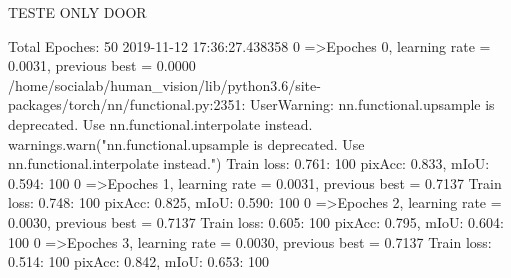 \bigskip

TESTE ONLY DOOR


Total Epoches: 50
2019-11-12 17:36:27.438358
  0%
=>Epoches 0, learning rate = 0.0031,                 previous best = 0.0000
/home/socialab/human_vision/lib/python3.6/site-packages/torch/nn/functional.py:2351: UserWarning: nn.functional.upsample is deprecated. Use nn.functional.interpolate instead.
  warnings.warn("nn.functional.upsample is deprecated. Use nn.functional.interpolate instead.")
Train loss: 0.761: 100%
pixAcc: 0.833, mIoU: 0.594: 100%
  0%
=>Epoches 1, learning rate = 0.0031,                 previous best = 0.7137
Train loss: 0.748: 100%
pixAcc: 0.825, mIoU: 0.590: 100%
  0%
=>Epoches 2, learning rate = 0.0030,                 previous best = 0.7137
Train loss: 0.605: 100%
pixAcc: 0.795, mIoU: 0.604: 100%
  0%
=>Epoches 3, learning rate = 0.0030,                 previous best = 0.7137
Train loss: 0.514: 100%
pixAcc: 0.842, mIoU: 0.653: 100%
